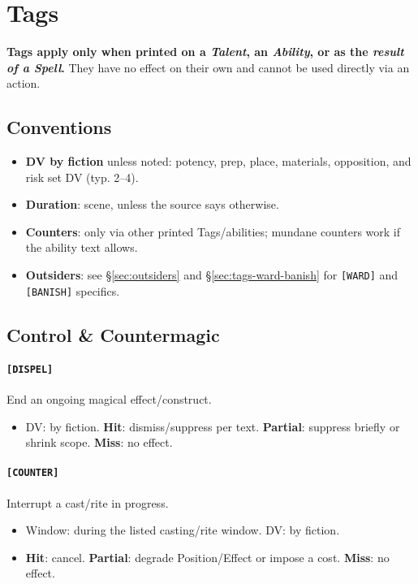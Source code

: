\documentclass[11pt]{article}
\begin{document}
\section{Tags}
\label{sec:tag-library}

\noindent\textbf{Tags apply only when printed on a \emph{Talent}, an \emph{Ability}, or as the \emph{result of a Spell}.} They have no effect on their own and cannot be used directly via an action.

\subsection*{Conventions}
\begin{itemize}
  \item \textbf{DV by fiction} unless noted: potency, prep, place, materials, opposition, and risk set DV (typ. 2--4).
  \item \textbf{Duration}: scene, unless the source says otherwise.
  \item \textbf{Counters}: only via other printed Tags/abilities; mundane counters work if the ability text allows.
  \item \textbf{Outsiders}: see \S\ref{sec:outsiders} and \S\ref{sec:tags-ward-banish} for \texttt{[WARD]} and \texttt{[BANISH]} specifics.
\end{itemize}

\subsection*{Control \& Countermagic}
\paragraph{\texttt{[DISPEL]}} End an ongoing magical effect/construct.
\begin{itemize}
  \item DV: by fiction. \textbf{Hit}: dismiss/suppress per text. \textbf{Partial}: suppress briefly or shrink scope. \textbf{Miss}: no effect.
\end{itemize}

\paragraph{\texttt{[COUNTER]}} Interrupt a cast/rite in progress.
\begin{itemize}
  \item Window: during the listed casting/rite window. DV: by fiction.
  \item \textbf{Hit}: cancel. \textbf{Partial}: degrade Position/Effect or impose a cost. \textbf{Miss}: no effect.
\end{itemize}
\end{document}
